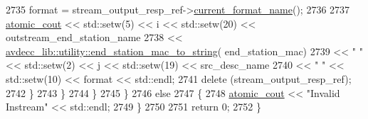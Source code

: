 \begin{DoxyCode}
2735                     format = stream\_output\_resp\_ref->\hyperlink{classavdecc__lib_1_1stream__output__descriptor__response_a24176b56bc0f1873b27d00565bc397c5}{current\_format\_name}();
2736 
2737                     \hyperlink{cmd__line_8h_a0bc38ccc65c79ba06c6fcd7b4bf554c3}{atomic\_cout} << std::setw(5) << i << std::setw(20) << 
      outstream\_end\_station\_name
2738                                 << 
      \hyperlink{namespaceavdecc__lib_1_1utility_a5a8f858065c29351840fac0842d82450}{avdecc\_lib::utility::end\_station\_mac\_to\_string}(
      end\_station\_mac)
2739                                 << \textcolor{stringliteral}{"   "} << std::setw(2) << j << std::setw(19) << src\_desc\_name
2740                                 << \textcolor{stringliteral}{"   "} << std::setw(10) << format << std::endl;
2741                     \textcolor{keyword}{delete} (stream\_output\_resp\_ref);
2742                 \}
2743             \}
2744         \}
2745     \}
2746     \textcolor{keywordflow}{else}
2747     \{
2748         \hyperlink{cmd__line_8h_a0bc38ccc65c79ba06c6fcd7b4bf554c3}{atomic\_cout} << \textcolor{stringliteral}{"Invalid Instream"} << std::endl;
2749     \}
2750 
2751     \textcolor{keywordflow}{return} 0;
2752 \}
\end{DoxyCode}


